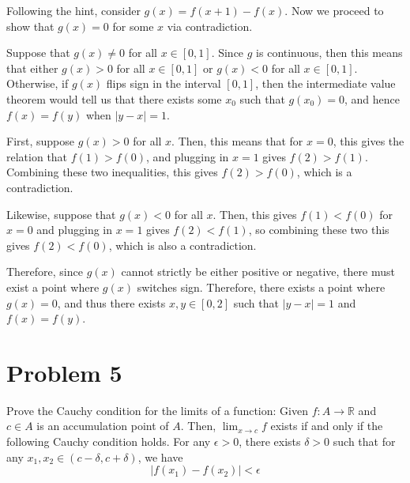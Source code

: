 \documentclass[10pt]{article}
\begin{document}
	\begin{solution}
		Following the hint, consider $g(x) = f(x+1) - f(x)$. 
		Now we proceed to show that $g(x)
		= 0$ for some $x$ via contradiction. 

		Suppose that $g(x) \neq 0$ for all $x \in [0, 1]$. Since $g$ is continuous, then this means that either
		$g(x) > 0$ for all $x \in [0, 1]$ or $g(x) < 0$ for all $x \in [0, 1]$. Otherwise, if $g(x)$ flips sign
		in the interval $[0, 1]$, then the intermediate value theorem would tell us that there exists some $x_0$
		such that $g(x_0) = 0$, and hence $f(x) = f(y)$ when $|y - x| = 1$.

		First, suppose $g(x) > 0$ for all $x$. 
		Then, this means that for $x = 0$, this gives the relation that $f(1) > f(0)$, and plugging in $x = 1$
		gives $f(2) > f(1)$. Combining these two inequalities, this gives $f(2) > f(0)$, which is a 
		contradiction. 

		Likewise, suppose that $g(x) < 0$ for all $x$. Then, this gives $f(1) < f(0)$ for $x = 0$ and plugging in
		$x = 1$ gives $f(2) < f(1)$, so combining these two this gives $f(2) < f(0)$, which is also a 
		contradiction. 

		Therefore, since $g(x)$ cannot strictly be either positive or negative, there must exist a point where
		$g(x)$ switches sign. Therefore, there exists a point where $g(x) = 0$, and thus there exists $x, y \in 
		[0, 2]$ such that $|y - x| = 1$ and $f(x) = f(y)$.
	\end{solution}

	\pagebreak

	\section*{Problem 5}
	Prove the Cauchy condition for the limits of a function: Given $f: A \to \mathbb R$ and $c \in A$ is an 
	accumulation point of $A$. Then, $\lim_{x \to c} f$ exists if and only if the following Cauchy condition 
	holds. For any $\epsilon > 0$, there exists $\delta > 0$ such that for any $x_1, x_2 \in (c - \delta, c + 
	\delta)$, we have
	\[
	|f(x_1) - f(x_2)| < \epsilon
	\] 
\end{document}
